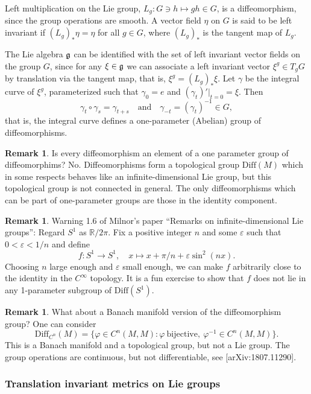 \documentclass{article}
\theoremstyle{plain}
\theoremstyle{definition}
\newtheorem{oss}[teo]{Remark}
\numberwithin{equation}{section}
\newcommand{\R}{\ensuremath{\mathbb{R}}}
\newcommand{\Diff}{\ensuremath{\mathrm{Diff}}}
\newcommand{\mf}{\ensuremath{\mathfrak}}
\begin{document}
Left multiplication on the Lie group, $L_g: G\ni h\mapsto gh\in G$, is a diffeomorphism, since the group operations are smooth. A vector field $\eta$ on $G$ is said to be left invariant if $(L_g)_*\eta=\eta$ for all $g\in G$, where $(L_g)_*$ is the tangent map of $L_g$.

The Lie algebra $\mf g$ can be identified with the set of left invariant vector fields on the group $G$, since for any $\xi\in\mf g$ we can associate a left invariant vector $\xi^g\in T_gG$ by translation via the tangent map, that is, $\xi^g=(L_g)_*\xi$. Let $\gamma$ be the integral curve of $\xi^g$, parameterized such that $\gamma_0=e$ and $(\gamma_t)'|_{t=0}=\xi$. Then
\[
  \gamma_t\circ \gamma_s=\gamma_{t+s}\quad \mathrm{and}\quad \gamma_{-t}=(\gamma_t)^{-1}\in G,
\]
that is, the integral curve defines a one-parameter (Abelian) group of diffeomorphisms.

\begin{oss}
	Is every diffeomorphism an element of a one parameter group of diffeomorphims? No. Diffeomorphisms form a topological group $\Diff(M)$ which in some respects behaves like an infinite-dimensional Lie group, but this topological group is not connected in general. The only diffeomorphisms which can be part of one-parameter groups are those in the identity component.
\end{oss}

\begin{oss}
	Warning 1.6 of Milnor's paper ``Remarks on infinite-dimensional Lie groups'': Regard $S^1$ as $\R/2\pi$. Fix a positive integer $n$ and some $\varepsilon$ such that $0<\varepsilon<1/n$ and define
	\[
	f: S^1\to S^1,\quad x\mapsto x+\pi/n+\varepsilon\sin^2(nx).
	\]
	Choosing $n$ large enough and $\varepsilon$ small enough, we can make $f$ arbitrarily close to the identity in the $C^\infty$ topology. It is a fun exercise to show that $f$ does not lie in any 1-parameter subgroup of $\Diff(S^1)$.
\end{oss}

\begin{oss}
	 What about a Banach manifold version of the diffeomorphism group? One can consider
	 \[
	 \Diff_{C^n}(M)=\{\varphi\in C^n(M,M): \varphi\ \mathrm{bijective},\ \varphi^{-1}\in C^n(M,M)\}.
	 \]
	 This is a Banach manifold and a topological group, but not a Lie group. The group operations are continuous, but not differentiable, see [arXiv:1807.11290].
\end{oss}


\subsubsection{Translation invariant metrics on Lie groups}
\end{document}
